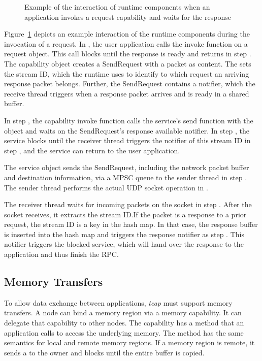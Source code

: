 \begin{figure}[h]
  \centering
  \resizebox{\textwidth}{!}{
    
  }
  \caption{\label{fig:tcap-request} Example of the interaction of runtime components when an application invokes a request capability and waits for the response}
\end{figure}

Figure~\ref{fig:tcap-request} depicts an example interaction of the runtime components during the invocation of a request. In , the user application calls the invoke function on a request object. This call blocks until the response is ready and returns in step . The capability object creates  a SendRequest with a  packet as content.
The  sets the stream ID, which the runtime uses to identify to which request an arriving response packet belongs. Further, the SendRequest contains a notifier, which the receive thread triggers when a response packet arrives and is ready in a shared buffer.

In step , the capability invoke function calls the service's send function with the  object and waits on the SendRequest's response available notifier. In step , the service blocks until the receiver thread triggers the notifier of this stream ID in step , and the service can return to the user application.

The service object sends the SendRequest, including the network packet buffer and destination information, via a \ac{MPSC} queue to the sender thread in step . The sender thread performs the actual \ac{UDP} socket operation in .

The receiver thread waits for incoming packets on the socket in step . After the socket receives, it extracts the stream ID.\@ If the packet is a response to a prior request, the stream ID is a key in the  hash map. In that case, the response buffer is inserted into the  hash map and triggers the response notifier as step . This notifier triggers the blocked service, which will hand over the response to the application and thus finish the \ac{RPC}.\@

\subsection{Memory Transfers}
To allow data exchange between applications, \emph{tcap} must support memory transfers. A node can bind a memory region via a memory capability. It can delegate that capability to other nodes.
The capability has a  method that an application calls to access the underlying memory. The method has the same semantics for local and remote memory regions. If a memory region is remote, it sends a  to the owner and blocks until the entire buffer is copied.

